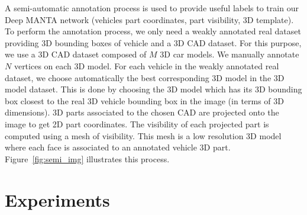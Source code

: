 \documentclass[10pt,twocolumn,letterpaper]{article}
\begin{document}
A semi-automatic annotation process is used to provide useful labels to train our Deep MANTA network (vehicles part coordinates, part visibility, 3D template). To perform the annotation process, we only need a weakly annotated real dataset providing 3D bounding boxes of vehicle and a 3D CAD dataset. For this purpose, we use a 3D CAD dataset composed of $M$ 3D car models. We manually annotate $N$ vertices on each 3D model. For each vehicle in the weakly annotated real dataset, we choose automatically the best corresponding 3D model in the 3D model dataset. This is done by choosing the 3D model which has its 3D bounding box closest to the real 3D vehicle bounding box in the image (in terms of 3D dimensions). 3D parts associated to the chosen CAD are projected onto the image to get 2D part coordinates. The visibility of each projected part is computed using a mesh of visibility. This mesh is a low resolution 3D model where each face is associated to an annotated vehicle 3D part. Figure~\ref{fig:semi_img} illustrates this process.











\section{Experiments}
\label{sec:experiments}
\end{document}
